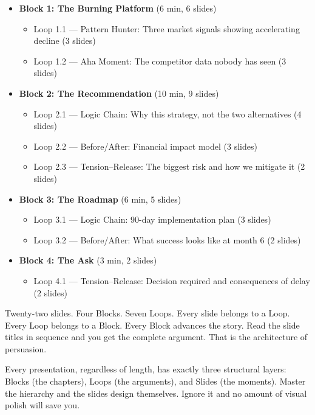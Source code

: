 \begin{itemize}[leftmargin=1.5em]
  \item \textbf{Block 1: The Burning Platform} (6 min, 6 slides)
  \begin{itemize}
    \item Loop 1.1 --- Pattern Hunter: Three market signals showing accelerating decline (3 slides)
    \item Loop 1.2 --- Aha Moment: The competitor data nobody has seen (3 slides)
  \end{itemize}
  \item \textbf{Block 2: The Recommendation} (10 min, 9 slides)
  \begin{itemize}
    \item Loop 2.1 --- Logic Chain: Why this strategy, not the two alternatives (4 slides)
    \item Loop 2.2 --- Before/After: Financial impact model (3 slides)
    \item Loop 2.3 --- Tension--Release: The biggest risk and how we mitigate it (2 slides)
  \end{itemize}
  \item \textbf{Block 3: The Roadmap} (6 min, 5 slides)
  \begin{itemize}
    \item Loop 3.1 --- Logic Chain: 90-day implementation plan (3 slides)
    \item Loop 3.2 --- Before/After: What success looks like at month 6 (2 slides)
  \end{itemize}
  \item \textbf{Block 4: The Ask} (3 min, 2 slides)
  \begin{itemize}
    \item Loop 4.1 --- Tension--Release: Decision required and consequences of delay (2 slides)
  \end{itemize}
\end{itemize}

Twenty-two slides. Four Blocks. Seven Loops. Every slide belongs to a Loop. Every Loop belongs to a Block. Every Block advances the story. Read the slide titles in sequence and you get the complete argument. That is the architecture of persuasion.

\begin{lessonbox}
Every presentation, regardless of length, has exactly three structural layers: Blocks (the chapters), Loops (the arguments), and Slides (the moments). Master the hierarchy and the slides design themselves. Ignore it and no amount of visual polish will save you.
\end{lessonbox}
